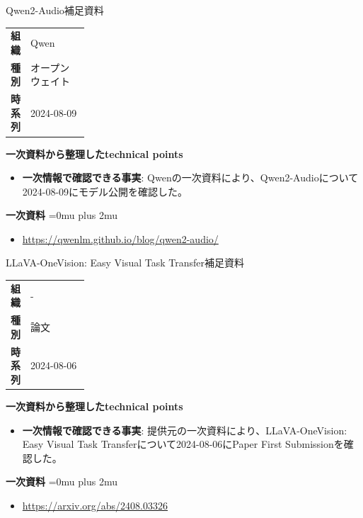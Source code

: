\begin{technicalnote}{Qwen2-Audio}{補足資料}
\begingroup
\begin{tabularx}{\linewidth}{@{}>{\bfseries}p{0.22\linewidth}X@{}}
組織 & Qwen \\
種別 & オープンウェイト \\
時系列 & 2024-08-09 \\
\end{tabularx}
\smallskip
{\bfseries 一次資料から整理したtechnical points}
\begin{itemize}[leftmargin=1.5em,itemsep=0.35em]
\item \textbf{一次情報で確認できる事実}: Qwenの一次資料により、Qwen2-Audioについて2024-08-09にモデル公開を確認した。
\end{itemize}
\begin{minipage}{\linewidth}
\begin{samepage}
{\bfseries 一次資料}
\begingroup\sloppy
\Urlmuskip=0mu plus 2mu\relax
\begin{itemize}[leftmargin=1.5em,itemsep=0.25em]
\item {\scriptsize\url{https://qwenlm.github.io/blog/qwen2-audio/}}
\end{itemize}
\endgroup
\end{samepage}
\end{minipage}
\endgroup
\end{technicalnote}
\medskip

\begin{technicalnote}{LLaVA-OneVision: Easy Visual Task Transfer}{補足資料}
\begingroup
\begin{tabularx}{\linewidth}{@{}>{\bfseries}p{0.22\linewidth}X@{}}
組織 & - \\
種別 & 論文 \\
時系列 & 2024-08-06 \\
\end{tabularx}
\smallskip
{\bfseries 一次資料から整理したtechnical points}
\begin{itemize}[leftmargin=1.5em,itemsep=0.35em]
\item \textbf{一次情報で確認できる事実}: 提供元の一次資料により、LLaVA-OneVision: Easy Visual Task Transferについて2024-08-06にPaper First Submissionを確認した。
\end{itemize}
\begin{minipage}{\linewidth}
\begin{samepage}
{\bfseries 一次資料}
\begingroup\sloppy
\Urlmuskip=0mu plus 2mu\relax
\begin{itemize}[leftmargin=1.5em,itemsep=0.25em]
\item {\scriptsize\url{https://arxiv.org/abs/2408.03326}}
\end{itemize}
\endgroup
\end{samepage}
\end{minipage}
\endgroup
\end{technicalnote}
\medskip

